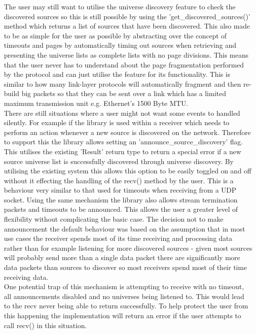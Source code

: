 \documentclass[11pt,a4paper]{article}
\begin{document}
The user may still want to utilise the universe discovery feature to check the discovered sources so this is still possible by using the 'get\_discovered\_sources()' method which returns a list of sources that have been discovered. This also made to be as simple for the user as possible by abstracting over the concept of timeouts and pages by automatically timing out sources when retrieving and presenting the universe lists as complete lists with no page divisions. This means that the user never has to understand about the page fragmentation performed by the protocol and can just utilise the feature for its functionality. This is similar to how many link-layer protocols will automatically fragment and then re-build big packets so that they can be sent over a link which has a limited maximum transmission unit e.g. Ethernet's 1500 Byte MTU.\\

There are still situations where a user might not want some events to handled silently. For example if the library is used within a receiver which needs to perform an action whenever a new source is discovered on the network. Therefore to support this the library allows setting an 'announce\_source\_discovery' flag. This utilises the existing 'Result' return type to return a special error if a new source universe list is successfully discovered through universe discovery. By utilising the existing system this allows this option to be easily toggled on and off without it effecting the handling of the recv() method by the user. This is a behaviour very similar to that used for timeouts when receiving from a UDP socket. Using the same mechanism the library also allows stream termination packets and timeouts to be announced. This allows the user a greater level of flexibility without complicating the basic case. The decision not to make announcement the default behaviour was based on the assumption that in most use cases the receiver spends most of its time receiving and processing data rather than for example listening for more discovered sources - given most sources will probably send more than a single data packet there are significantly more data packets than sources to discover so most receivers spend most of their time receiving data.\\

One potential trap of this mechanism is attempting to receive with no timeout, all announcements disabled and no universes being listened to. This would lead to the recv never being able to return successfully. To help protect the user from this happening the implementation will return an error if the user attempts to call recv() in this situation.\\
\end{document}
